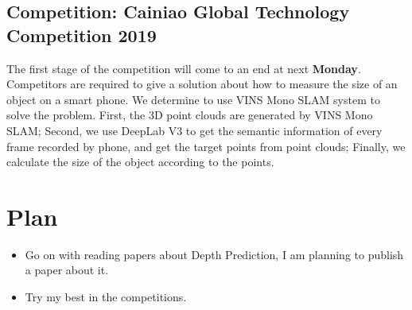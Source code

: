 \documentclass{article}
\begin{document}
 \subsection{Competition: Cainiao Global Technology Competition 2019}
 The first stage of the competition will come to an end at next \textbf{Monday}. Competitors are required to give a solution about how to measure the size of an object on a smart phone. We determine to use VINS Mono SLAM system to solve the problem. First, the 3D point clouds are generated by VINS Mono SLAM; Second, we use DeepLab V3 to get the semantic information of every frame recorded by phone, and get the target points from point clouds; Finally, we calculate the size of the object according to the points.

 \section{Plan}
 \begin{itemize}
    \item Go on with reading papers about Depth Prediction, I am planning to publish a paper about it.
    \item Try my best in the competitions.
 \end{itemize}

 
\end{document}

